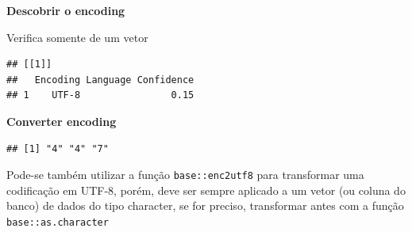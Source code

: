 \documentclass[
]{book}
\newenvironment{Shaded}{\begin{snugshade}}{\end{snugshade}}
\newcommand{\AttributeTok}[1]{\textcolor[rgb]{0.77,0.63,0.00}{#1}}
\newcommand{\CommentTok}[1]{\textcolor[rgb]{0.56,0.35,0.01}{\textit{#1}}}
\newcommand{\DecValTok}[1]{\textcolor[rgb]{0.00,0.00,0.81}{#1}}
\newcommand{\FunctionTok}[1]{\textcolor[rgb]{0.00,0.00,0.00}{#1}}
\newcommand{\NormalTok}[1]{#1}
\newcommand{\OtherTok}[1]{\textcolor[rgb]{0.56,0.35,0.01}{#1}}
\newcommand{\SpecialCharTok}[1]{\textcolor[rgb]{0.00,0.00,0.00}{#1}}
\newcommand{\StringTok}[1]{\textcolor[rgb]{0.31,0.60,0.02}{#1}}
\theoremstyle{definition}
\theoremstyle{definition}
\theoremstyle{definition}
\theoremstyle{definition}
\theoremstyle{remark}
\begin{document}
\textbf{Descobrir o encoding}

Verifica somente de um vetor

\begin{Shaded}
\end{Shaded}

\begin{verbatim}
## [[1]]
##   Encoding Language Confidence
## 1    UTF-8                0.15
\end{verbatim}

\textbf{Converter encoding}

\begin{Shaded}
\end{Shaded}

\begin{verbatim}
## [1] "4" "4" "7"
\end{verbatim}

Pode-se também utilizar a função \texttt{base::enc2utf8} para transformar uma codificação em UTF-8, porém, deve ser sempre aplicado a um vetor (ou coluna do banco) de dados do tipo character, se for preciso, transformar antes com a função \texttt{base::as.character}

\begin{Shaded}
\end{Shaded}
\end{document}

